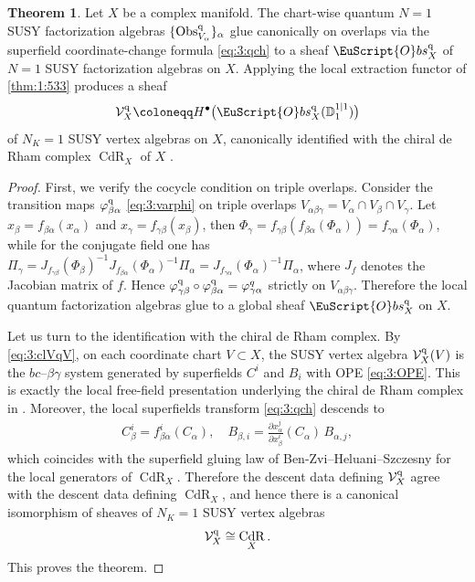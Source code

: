 \documentclass[final,reqno]{amsart}
\numberwithin{equation}{section}
\theoremstyle{definition}
\newtheorem{thm}{Theorem}[section]
\newcommand{\bl}{\bullet}
\newcommand{\ceq}{\coloneqq} %
\newcommand{\q}{\textup{q}}
\newcommand{\tcl}{\textup{cl}}
\newcommand{\sD}{\mathbb{D}^{1|1}}
\newcommand{\clV}{\mathcal{V}}
\newcommand{\pd}{\partial}
\newcommand{\qObs}[1]{\mathop{\Obs^{\textup{q}}_{#1}}}
\newcommand{\sqObs}[1]{\mathop{\EuScript{O}bs^{\q}_{#1}}}
\DeclareMathOperator{\CdR}{CdR}
\DeclareMathOperator{\Obs}{Obs}
\begin{document}
\begin{thm}\label{thm:3:obs}
Let $X$ be a complex manifold. 
The chart-wise quantum $N=1$ SUSY factorization algebras 
$\{\qObs{V_\alpha}\}_\alpha$ glue canonically on overlaps 
via the superfield coordinate-change formula \eqref{eq:3:qch}
to a sheaf $\sqObs{X}$ of $N=1$ SUSY factorization algebras on $X$.
Applying the local extraction functor of \cref{thm:1:533} produces a sheaf
\[
 \clV^{\q}_X \ceq H^{\bl}\bigl(\sqObs{X}(\sD_1)\bigr)
\]
of $N_K=1$ SUSY vertex algebras on $X$, canonically identified with 
the chiral de Rham complex $\CdR_X$ of $X$ \cite{MSV,GMS3}.
\end{thm}

\begin{proof}
First, we verify the cocycle condition on triple overlaps.
Consider the transition maps $\varphi^{\q}_{\beta\alpha}$ \eqref{eq:3:varphi}
on triple overlaps 
$V_{\alpha\beta\gamma} = V_{\alpha}\cap V_{\beta}\cap V_{\gamma}$.
Let $x_\beta = f_{\beta\alpha}(x_\alpha)$ and 
$x_\gamma = f_{\gamma\beta}(x_\beta)$, then
$\Phi_\gamma=f_{\gamma\beta}(f_{\beta\alpha}(\Phi_\alpha)) 
=f_{\gamma\alpha}(\Phi_\alpha)$,
while for the conjugate field one has
$\Pi_\gamma
= J_{f_{ \gamma\beta}}(\Phi_\beta )^{-1} 
  J_{f_{ \beta\alpha}}(\Phi_\alpha)^{-1} \Pi_\alpha
= J_{f_{\gamma\alpha}}(\Phi_\alpha)^{-1} \Pi_\alpha$,
where $J_f$ denotes the Jacobian matrix of $f$.  
Hence 
$\varphi^{\q}_{\gamma\beta} \circ \varphi^{\q}_{\beta\alpha} 
=\varphi^q_{\gamma\alpha}$ strictly on $V_{\alpha\beta\gamma}$. 
Therefore the local quantum factorization algebras glue to 
a global sheaf $\sqObs{X}$ on $X$.

Let us turn to the identification with the chiral de Rham complex.
By \eqref{eq:3:clVqV}, on each coordinate chart $V \subset X$, 
the SUSY vertex algebra $\clV^{\q}_X(V)$ is the $bc$--$\beta\gamma$ system
generated by superfields $C^i$ and $B_i$ with OPE \eqref{eq:3:OPE}. 
This is exactly the local free-field presentation 
underlying the chiral de Rham complex in \cite{MSV,BHS}. 
Moreover, the local superfields transform \eqref{eq:3:qch} descends to 
\begin{align*}
 C^i_\beta = f^i_{\beta\alpha}(C_\alpha), \quad
 B_{\beta,i} = \frac{\pd x^j_\alpha}{\pd x^i_\beta}(C_\alpha)\,B_{\alpha,j},
\end{align*}
which coincides with the superfield gluing law of Ben-Zvi--Heluani--Szczesny 
\cite[(4.2.2)]{BHS} for the local generators of $\CdR_X$. 
Therefore the descent data defining $\clV^{\q}_X$ agree with 
the descent data defining $\CdR_X$, 
and hence there is a canonical isomorphism of sheaves of $N_K=1$ SUSY vertex algebras
\[
 \clV^{\q}_X \cong \CdR_X.
\]
This proves the theorem.
\end{proof}
\end{document}
